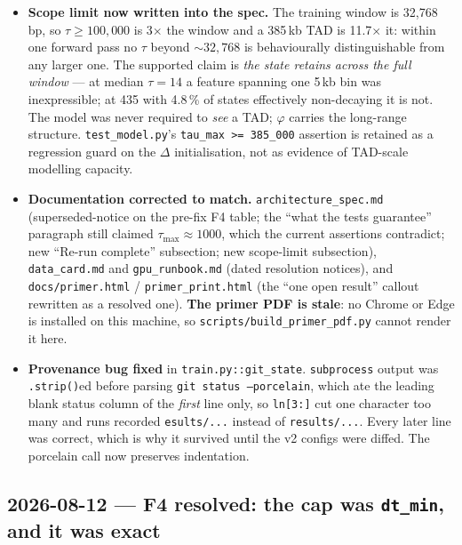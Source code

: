 \documentclass[11pt,a4paper]{article}
\newcommand{\code}[1]{\texttt{\small #1}}
\begin{document}
\begin{itemize}
gate in \code{architecture\_spec.md} \S4.1.3 is $\Delta_{S1} \ge
2\sigma_{\mathrm{real}}$, so the bar is \textbf{0.0050 bits} --- tighter than
before, and comparable to the spread between seeds 1 and 2 (1.5172 vs 1.5223).
\item \textbf{Scope limit now written into the spec.} The training window is
32{,}768\,bp, so $\tau \ge 100{,}000$ is 3$\times$ the window and a 385\,kb TAD
is 11.7$\times$ it: within one forward pass no $\tau$ beyond ${\sim}32{,}768$ is
behaviourally distinguishable from any larger one. The supported claim is
\emph{the state retains across the full window} --- at median $\tau = 14$ a
feature spanning one 5\,kb bin was inexpressible; at 435 with 4.8\,\% of states
effectively non-decaying it is not. The model was never required to \emph{see} a
TAD; $\varphi$ carries the long-range structure. \code{test\_model.py}'s
\code{tau\_max >= 385\_000} assertion is retained as a regression guard on the
$\Delta$ initialisation, not as evidence of TAD-scale modelling capacity.
\item \textbf{Documentation corrected to match.} \code{architecture\_spec.md}
(superseded-notice on the pre-fix F4 table; the ``what the tests guarantee''
paragraph still claimed $\tau_{\max} \approx 1000$, which the current assertions
contradict; new ``Re-run complete'' subsection; new scope-limit subsection),
\code{data\_card.md} and \code{gpu\_runbook.md} (dated resolution notices), and
\code{docs/primer.html} / \code{primer\_print.html} (the ``one open result''
callout rewritten as a resolved one). \textbf{The primer PDF is stale}: no
Chrome or Edge is installed on this machine, so
\code{scripts/build\_primer\_pdf.py} cannot render it here.
\item \textbf{Provenance bug fixed} in \code{train.py::git\_state}.
\code{subprocess} output was \code{.strip()}ed before parsing \code{git status
--porcelain}, which ate the leading blank status column of the \emph{first} line
only, so \code{ln[3:]} cut one character too many and runs recorded
\code{esults/...} instead of \code{results/...}. Every later line was correct,
which is why it survived until the v2 configs were diffed. The porcelain call
now preserves indentation.
\end{itemize}

\subsection*{2026-08-12 --- F4 resolved: the cap was \code{dt\_min}, and it was
exact}
\end{document}
